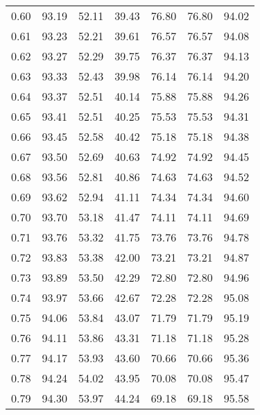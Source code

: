 \begin{tabular}{|c|c|c|c|c|c|c|}
      0.60 &     93.19 &     52.11 &      39.43 &   76.80 &      76.80 &         94.02 \\
      0.61 &     93.23 &     52.21 &      39.61 &   76.57 &      76.57 &         94.08 \\
      0.62 &     93.27 &     52.29 &      39.75 &   76.37 &      76.37 &         94.13 \\
      0.63 &     93.33 &     52.43 &      39.98 &   76.14 &      76.14 &         94.20 \\
      0.64 &     93.37 &     52.51 &      40.14 &   75.88 &      75.88 &         94.26 \\
      0.65 &     93.41 &     52.51 &      40.25 &   75.53 &      75.53 &         94.31 \\
      0.66 &     93.45 &     52.58 &      40.42 &   75.18 &      75.18 &         94.38 \\
      0.67 &     93.50 &     52.69 &      40.63 &   74.92 &      74.92 &         94.45 \\
      0.68 &     93.56 &     52.81 &      40.86 &   74.63 &      74.63 &         94.52 \\
      0.69 &     93.62 &     52.94 &      41.11 &   74.34 &      74.34 &         94.60 \\
      0.70 &     93.70 &     53.18 &      41.47 &   74.11 &      74.11 &         94.69 \\
      0.71 &     93.76 &     53.32 &      41.75 &   73.76 &      73.76 &         94.78 \\
      0.72 &     93.83 &     53.38 &      42.00 &   73.21 &      73.21 &         94.87 \\
      0.73 &     93.89 &     53.50 &      42.29 &   72.80 &      72.80 &         94.96 \\
      0.74 &     93.97 &     53.66 &      42.67 &   72.28 &      72.28 &         95.08 \\
      0.75 &     94.06 &     53.84 &      43.07 &   71.79 &      71.79 &         95.19 \\
      0.76 &     94.11 &     53.86 &      43.31 &   71.18 &      71.18 &         95.28 \\
      0.77 &     94.17 &     53.93 &      43.60 &   70.66 &      70.66 &         95.36 \\
      0.78 &     94.24 &     54.02 &      43.95 &   70.08 &      70.08 &         95.47 \\
      0.79 &     94.30 &     53.97 &      44.24 &   69.18 &      69.18 &         95.58 \\

\end{tabular}
